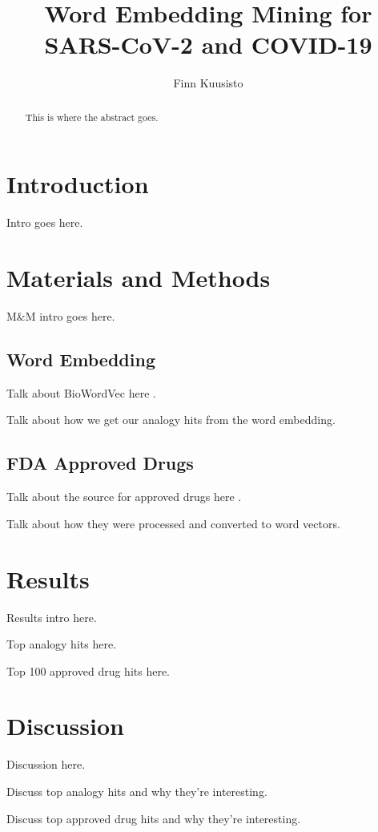 \documentclass{article}
\begin{document}
\title{Word Embedding Mining for SARS-CoV-2 and COVID-19}
\author{Finn Kuusisto}
\maketitle

\begin{abstract}
This is where the abstract goes.
\end{abstract}

\section{Introduction}
Intro goes here.

\section{Materials and Methods}
M\&M intro goes here.

\subsection{Word Embedding}
Talk about BioWordVec here \cite{zhang2019biowordvec}.

Talk about how we get our analogy hits from the word embedding.

\subsection{FDA Approved Drugs}
Talk about the source for approved drugs here \cite{fdadrugs}.

Talk about how they were processed and converted to word vectors.

\section{Results}
Results intro here.

Top analogy hits here.

Top 100 approved drug hits here.

\section{Discussion}
Discussion here.

Discuss top analogy hits and why they're interesting.

Discuss top approved drug hits and why they're interesting.



\end{document}
